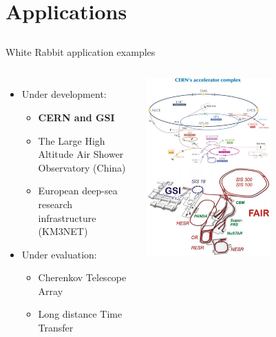 \documentclass[compress, red]{beamer}
\begin{document}
\section{Applications}
\subsection{}

\begin{frame}{White Rabbit application examples}
\begin{columns}[c]
    \begin{itemize}
      \item Under development:
      \begin{itemize}
	\item \textbf{CERN and GSI}
	\item The Large High Altitude Air Shower Observatory (China)
	\item European deep-sea research infrastructure (KM3NET) 
      \end{itemize}         	
      \item Under evaluation:
      \begin{itemize}
	\item Cherenkov Telescope Array
	\item Long distance Time Transfer
      \end{itemize}         	
    \end{itemize}    
    \begin{center}
      \includegraphics[width=0.6\textwidth]{applications/gsiANDcern.pdf}
      \end{center}
\end{columns}
\end{frame}
\end{document}
